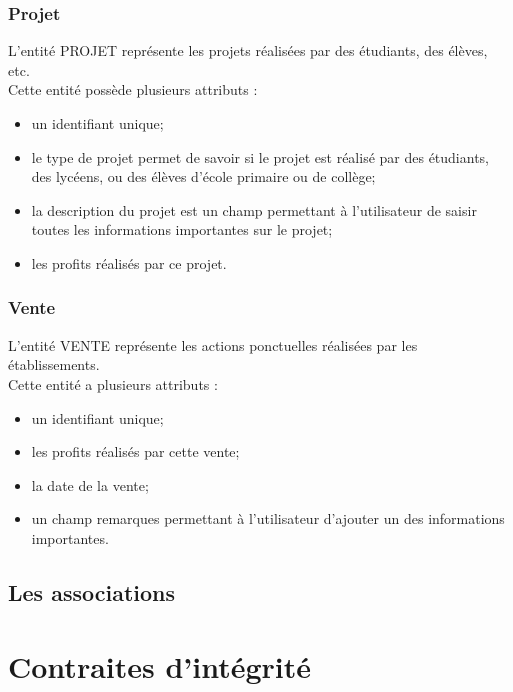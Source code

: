 \documentclass[asi, sansVersion]{picINSA}
\begin{document}
\subsection*{Projet}
L'entité PROJET représente les projets réalisées par des étudiants, des élèves, etc. \\
Cette entité possède plusieurs attributs : 
\begin{itemize}
\item un identifiant unique;
\item  le type de projet permet de savoir si le projet est réalisé par des étudiants, des lycéens, ou des élèves d'école primaire ou de collège; 
\item la description du projet est un champ permettant à l'utilisateur de saisir toutes les informations importantes sur le projet;
\item les profits réalisés par ce projet.
\end{itemize}

\subsection*{Vente}
L'entité VENTE représente les actions ponctuelles réalisées par les établissements. \\ 
Cette entité a plusieurs attributs : 
\begin{itemize}
\item un identifiant unique; 
\item les profits réalisés par cette vente;
\item la date de la vente;
\item un champ remarques permettant à l'utilisateur d'ajouter un des informations importantes. 
\end{itemize}
\section{Les associations}

\chapter{Contraites d'intégrité}
\end{document}
